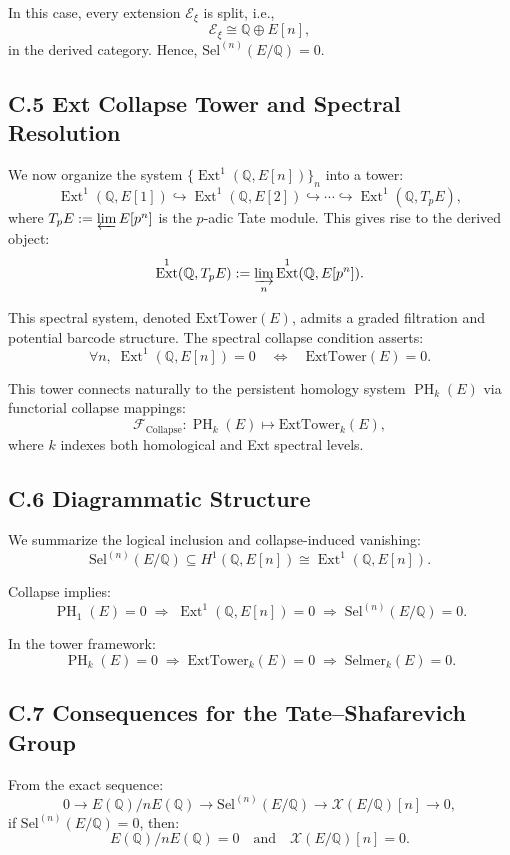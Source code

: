 \documentclass[11pt]{article}
\DeclareMathOperator{\Ext}{Ext}
\DeclareMathOperator{\PH}{PH}
\newcommand{\QQ}{\mathbb{Q}}
\newcommand{\Sha}{\mathcal{X}}
\begin{document}
In this case, every extension $\mathcal{E}_\xi$ is split, i.e.,
\[
\mathcal{E}_\xi \cong \QQ \oplus E[n],
\]
in the derived category. Hence, $\mathrm{Sel}^{(n)}(E/\QQ) = 0$.

\subsection*{C.5 Ext Collapse Tower and Spectral Resolution}

We now organize the system $\{ \Ext^1(\QQ, E[n]) \}_n$ into a tower:
\[
\Ext^1(\QQ, E[1]) \hookrightarrow \Ext^1(\QQ, E[2]) \hookrightarrow \cdots \hookrightarrow \Ext^1(\QQ, T_pE),
\]
where $T_pE := \varprojlim E[p^n]$ is the $p$-adic Tate module. This gives rise to the derived object:
\[
\Ext^1(\QQ, T_pE) := \varinjlim_n \Ext^1(\QQ, E[p^n]).
\]

This spectral system, denoted $\mathrm{ExtTower}(E)$, admits a graded filtration and potential barcode structure. The spectral collapse condition asserts:
\[
\forall n,\; \Ext^1(\QQ,E[n]) = 0 \quad \Leftrightarrow \quad \mathrm{ExtTower}(E) = 0.
\]

This tower connects naturally to the persistent homology system $\PH_k(E)$ via functorial collapse mappings:
\[
\mathcal{F}_{\mathrm{Collapse}} : \PH_k(E) \mapsto \mathrm{ExtTower}_k(E),
\]
where $k$ indexes both homological and Ext spectral levels.

\subsection*{C.6 Diagrammatic Structure}

We summarize the logical inclusion and collapse-induced vanishing:
\[
\mathrm{Sel}^{(n)}(E/\QQ) \subseteq H^1(\QQ,E[n]) \cong \Ext^1(\QQ,E[n]).
\]

Collapse implies:
\[
\PH_1(E) = 0 \;\Rightarrow\; \Ext^1(\QQ,E[n]) = 0 \;\Rightarrow\; \mathrm{Sel}^{(n)}(E/\QQ) = 0.
\]

In the tower framework:
\[
\PH_k(E) = 0 \;\Rightarrow\; \mathrm{ExtTower}_k(E) = 0 \;\Rightarrow\; \mathrm{Selmer}_k(E) = 0.
\]

\subsection*{C.7 Consequences for the Tate--Shafarevich Group}

From the exact sequence:
\[
0 \to E(\QQ)/nE(\QQ) \to \mathrm{Sel}^{(n)}(E/\QQ) \to \Sha(E/\QQ)[n] \to 0,
\]
if $\mathrm{Sel}^{(n)}(E/\QQ) = 0$, then:
\[
E(\QQ)/nE(\QQ) = 0 \quad \text{and} \quad \Sha(E/\QQ)[n] = 0.
\]
\end{document}
